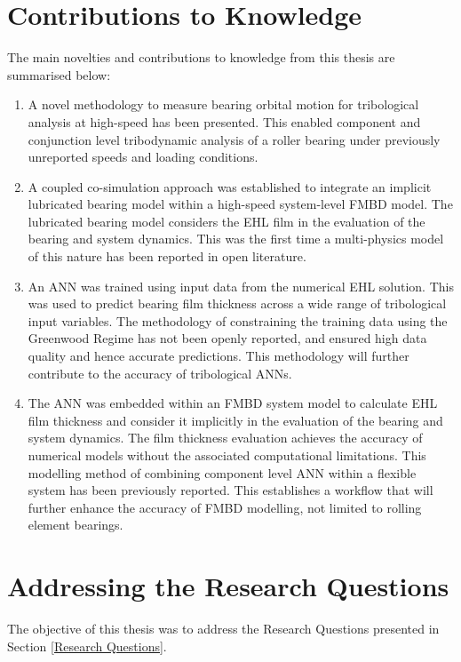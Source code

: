 \section{Contributions to Knowledge} \label{Contribution to Knowledge}

The main novelties and contributions to knowledge from this thesis are summarised below:

\begin{enumerate}
	\item A novel methodology to measure bearing orbital motion for tribological analysis at high-speed has been presented. This enabled component and conjunction level tribodynamic analysis of a roller bearing under previously unreported speeds and loading conditions.
	\item A coupled co-simulation approach was established to integrate an implicit lubricated bearing model within a high-speed system-level FMBD model. The lubricated bearing model considers the EHL film in the evaluation of the bearing and system dynamics. This was the first time a multi-physics model of this nature has been reported in open literature.
	\item An ANN was trained using input data from the numerical EHL solution. This was used to predict bearing film thickness across a wide range of tribological input variables. The methodology of constraining the training data using the Greenwood Regime has not been openly reported, and ensured high data quality and hence accurate predictions. This methodology will further contribute to the accuracy of tribological ANNs.
	\item The ANN was embedded within an FMBD system model to calculate EHL film thickness and consider it implicitly in the evaluation of the bearing and system dynamics. The film thickness evaluation achieves the accuracy of numerical models without the associated computational limitations. This modelling method of combining component level ANN within a flexible system has been previously reported. This establishes a workflow that will further enhance the accuracy of FMBD modelling, not limited to rolling element bearings.
\end{enumerate}

\section{Addressing the Research Questions}

The objective of this thesis was to address the Research Questions presented in Section \ref{Research Questions}.

